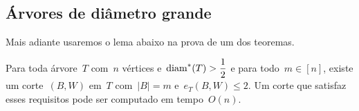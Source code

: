 

	\bigskip
	




	\subsection{Árvores de diâmetro grande}

	Mais adiante usaremos  	o lema abaixo na prova de 
	um dos teoremas.

	\begin{lem}
	\label{lema:caminhoLongo}
		Para toda árvore~$T$ com~$n$ 
		vértices e~${\mathrm{diam}^*(T)>\dfrac{1}{2}}$
		e para todo~${m\in[n]}$, existe um corte~$(B,W)$ em~$T$
		com~${|B|=m}$ e~${e_T(B,W)\le 2}$. Um corte que satisfaz esses
		requisitos pode ser computado em tempo~$O(n)$.
	\end{lem}

	\medskip
	\medskip

